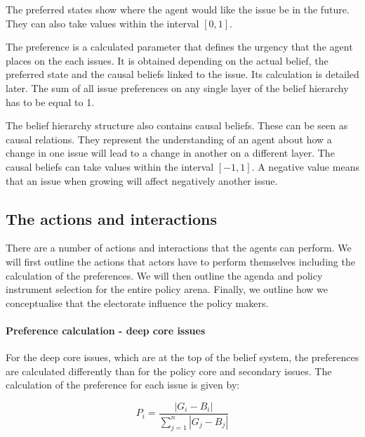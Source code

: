 \documentclass[11pt]{article}
\begin{document}
The preferred states show where the agent would like the issue be in the future. They can also take values within the interval $[0, 1]$.

The preference is a calculated parameter that defines the urgency that the agent places on the each issues. It is obtained depending on the actual belief, the preferred state and the causal beliefs linked to the issue. Its calculation is detailed later. The sum of all issue preferences on any single layer of the belief hierarchy has to be equal to 1.

The belief hierarchy structure also contains causal beliefs. These can be seen as causal relations. They represent the understanding of an agent about how a change in one issue will lead to a change in another on a different layer. The causal beliefs can take values within the interval $[-1, 1]$. A negative value means that an issue when growing will affect negatively another issue.



\subsection{The actions and interactions}


There are a number of actions and interactions that the agents can perform. We will first outline the actions that actors have to perform themselves including the calculation of the preferences. We will then outline the agenda and policy instrument selection for the entire policy arena. Finally, we outline how we conceptualise that the electorate influence the policy makers.

\paragraph{Preference calculation - deep core issues}

For the deep core issues, which are at the top of the belief system, the preferences are calculated differently than for the policy core and secondary issues. The calculation of the preference for each issue is given by:

\begin{equation}
P_i = \frac{ |G_i - B_i|}{\sum_{j=1}^n |G_j - B_j|}
\end{equation}
\end{document}
